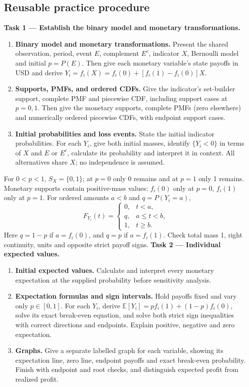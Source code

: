 \subsection{Reusable practice procedure}
\textbf{Task 1 --- Establish the binary model and monetary transformations.}
\begin{enumerate}
\item \textbf{Binary model and monetary transformations.} Present the shared observation, period, event $E$, complement $E^c$, indicator $X$, Bernoulli model and initial $p=P(E)$. Then give each monetary variable's state payoffs in USD and derive $Y_i=f_i(X)=f_i(0)+[f_i(1)-f_i(0)]X$.
\item \textbf{Supports, PMFs, and ordered CDFs.} Give the indicator's set-builder support, complete PMF and piecewise CDF, including support cases at $p=0,1$. Then give the monetary supports, complete PMFs (zero elsewhere) and numerically ordered piecewise CDFs, with endpoint support cases.
\item \textbf{Initial probabilities and loss events.} State the initial indicator probabilities. For each $Y_i$, give both initial masses, identify $\{Y_i<0\}$ in terms of $X$ and $E$ or $E^c$, calculate its probability and interpret it in context. All alternatives share $X$; no independence is assumed.
\end{enumerate}
For $0<p<1$, $S_X=\{0,1\}$; at $p=0$ only 0 remains and at $p=1$ only 1 remains.
Monetary supports contain positive-mass values: $f_i(0)$ only at $p=0$, $f_i(1)$ only at $p=1$.
For ordered amounts $a<b$ and $q=P(Y_i=a)$,
\[
F_{Y_i}(t)=\begin{cases}0,&t<a,\\q,&a\leq t<b,\\1,&t\geq b.\end{cases}
\]
Here $q=1-p$ if $a=f_i(0)$, and $q=p$ if $a=f_i(1)$.
Check total mass 1, right continuity, units and opposite strict payoff signs.
\textbf{Task 2 --- Individual expected values.}
\begin{enumerate}
\item \textbf{Initial expected values.} Calculate and interpret every monetary expectation at the supplied probability before sensitivity analysis.
\item \textbf{Expectation formulas and sign intervals.} Hold payoffs fixed and vary only $p\in[0,1]$. For each $Y_i$, derive $\mathbb E[Y_i]=p f_i(1)+(1-p)f_i(0)$, solve its exact break-even equation, and solve both strict sign inequalities with correct directions and endpoints. Explain positive, negative and zero expectation.
\item \textbf{Graphs.} Give a separate labelled graph for each variable, showing its expectation line, zero line, endpoint payoffs and exact break-even probability. Finish with endpoint and root checks, and distinguish expected profit from realized profit.
\end{enumerate}
